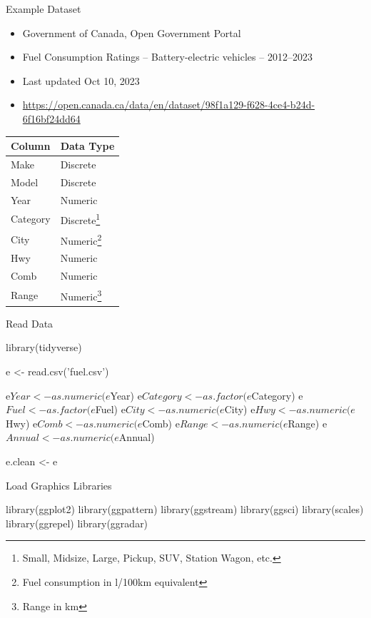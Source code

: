 \documentclass[ignorenonframetext,xcolor=x11names]{beamer}
\begin{document}
\begin{frame}{Example Dataset}
\begin{itemize}
  \item Government of Canada, Open Government Portal
  \item Fuel Consumption Ratings -- Battery-electric vehicles -- 2012--2023
  \item Last updated Oct 10, 2023
  \item \href{https://open.canada.ca/data/en/dataset/98f1a129-f628-4ce4-b24d-6f16bf24dd64}{https://open.canada.ca/data/en/dataset/98f1a129-f628-4ce4-b24d-6f16bf24dd64}
\end{itemize}
\centering
\footnotesize

	\begin{tabular}{|l|l|} \hline
	  {\bf Column} & {\bf Data Type} \\ \hline \hline
	  Make & Discrete \\ 
	  Model & Discrete \\
	  Year & Numeric \\
	  Category & Discrete\footnote{Small, Midsize, Large, Pickup, SUV, Station Wagon, etc.} \\
	  City & Numeric\footnote{Fuel consumption in l/100km equivalent} \\
	  Hwy & Numeric \\
	  Comb & Numeric \\
	  Range & Numeric\footnote{Range in km} \\ \hline
	\end{tabular}
\end{frame}

\begin{frame}[fragile]{Read Data}
\small
\begin{Rcode}
library(tidyverse)

e <- read.csv('fuel.csv')

e$Year <- as.numeric(e$Year)
e$Category <- as.factor(e$Category)
e$Fuel <- as.factor(e$Fuel)
e$City <- as.numeric(e$City)
e$Hwy <- as.numeric(e$Hwy)
e$Comb <- as.numeric(e$Comb)
e$Range <- as.numeric(e$Range)
e$Annual <- as.numeric(e$Annual)

e.clean <- e
\end{Rcode}
\end{frame}

\begin{frame}[fragile]{Load Graphics Libraries}
\small
\begin{Rcode}
library(ggplot2)
library(ggpattern)
library(ggstream)
library(ggsci)
library(scales)
library(ggrepel)
library(ggradar)
\end{Rcode}
\end{frame}
\end{document}
